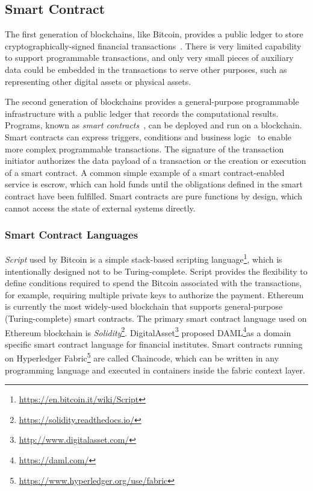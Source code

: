 \subsection{Smart Contract}
\label{sec:smartcontract}

The first generation of blockchains, like Bitcoin, provides a public ledger to store cryptographically-signed financial transactions~\cite{Swan:blockchain}. %
There is very limited capability to support programmable transactions, and only very small pieces of auxiliary data could be embedded in the transactions to serve other purposes, such as representing other digital assets or physical assets.

The second generation of blockchains provides a general-purpose programmable infrastructure with a public ledger that records the computational results. Programs, known as \emph{smart contracts}~\cite{Omohundro:2014}, can be deployed and run on a blockchain. Smart contracts can express triggers, conditions and business logic~\cite{Weber:BPM2016} to enable more complex programmable transactions. The signature of the transaction initiator authorizes the data payload of a transaction or the creation or execution of a smart contract. A common simple example of a smart contract-enabled service is escrow, which can hold funds until the obligations defined in the smart contract have been fulfilled. Smart contracts are pure functions by design, which cannot access the state of external systems directly. 

\subsubsection*{Smart Contract Languages}

\textit{Script} used by Bitcoin is a simple stack-based scripting language\footnote{\url{https://en.bitcoin.it/wiki/Script}}, which is intentionally designed not to be Turing-complete. Script provides the flexibility to define conditions required to spend the Bitcoin associated with the transactions, for example, requiring multiple private keys to authorize the payment. Ethereum is currently the most widely-used blockchain that supports general-purpose (Turing-complete) smart contracts. The primary smart contract language used on Ethereum blockchain is \textit{Solidity}\footnote{\url{https://solidity.readthedocs.io/}}. DigitalAsset\footnote{\url{http://www.digitalasset.com/}} proposed DAML\footnote{\url{https://daml.com/}}as a domain specific smart contract language for financial institutes. Smart contracts running on Hyperledger Fabric\footnote{\url{https://www.hyperledger.org/use/fabric}} are called Chaincode, which can be written in any programming language and executed in containers inside the fabric context layer.


